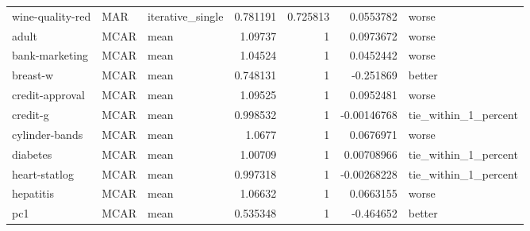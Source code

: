 \begin{table}[ht]
\begin{tabular}{lllrrrl}
 wine-quality-red     & MAR         & iterative\_single &                                 0.781191 &                             0.725813 &                     0.0553782  & worse                \\
 adult                & MCAR        & mean             &                                 1.09737  &                             1        &                     0.0973672  & worse                \\
 bank-marketing       & MCAR        & mean             &                                 1.04524  &                             1        &                     0.0452442  & worse                \\
 breast-w             & MCAR        & mean             &                                 0.748131 &                             1        &                    -0.251869   & better               \\
 credit-approval      & MCAR        & mean             &                                 1.09525  &                             1        &                     0.0952481  & worse                \\
 credit-g             & MCAR        & mean             &                                 0.998532 &                             1        &                    -0.00146768 & tie\_within\_1\_percent \\
 cylinder-bands       & MCAR        & mean             &                                 1.0677   &                             1        &                     0.0676971  & worse                \\
 diabetes             & MCAR        & mean             &                                 1.00709  &                             1        &                     0.00708966 & tie\_within\_1\_percent \\
 heart-statlog        & MCAR        & mean             &                                 0.997318 &                             1        &                    -0.00268228 & tie\_within\_1\_percent \\
 hepatitis            & MCAR        & mean             &                                 1.06632  &                             1        &                     0.0663155  & worse                \\
 pc1                  & MCAR        & mean             &                                 0.535348 &                             1        &                    -0.464652   & better               \\

\end{tabular}
\end{table}
